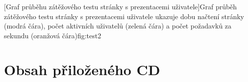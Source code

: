 \documentclass[11pt,twoside,a4paper]{book}
\begin{document}
%
[Graf průběhu zátěžového testu stránky s prezentacemi uživatele]{Graf průběh zátěžového testu stránky s prezentacemi uživatele ukazuje dobu načtení stránky (modrá čára), počet aktivních uživatelů (zelená čára) a počet požadavků za sekundu (oranžová čára)}{fig:test2}
	

\chapter{Obsah přiloženého CD}

\end{document}
